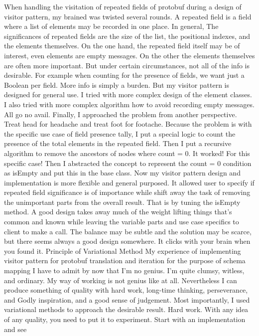 When handling the visitation of repeated fields of protobuf during a design of visitor pattern,
my brained was twisted several rounds.
A repeated field is a field where a list of elements may be recorded in one place. In general,
The significances of repeated fields are the size of the list, the positional indexes, and the
elements themselves. On the one hand, the repeated field itself may be of interest, even elements
are empty messages. On the other the elements themselves are often more important. But under
certain circumstances, not all of the info is desirable. For example when counting for the
presence of fields, we want just a Boolean per field. More info is simply a burden. But my
visitor pattern is designed for general use.
I tried with more complex design of the element classes. I also tried with more complex algorithm
how to avoid recording empty messages. All go no avail.
Finally, I approached the problem from another perspective. Treat head for headache and treat
foot for footache. Because the problem
is with the specific use case of field presence tally, I put a special logic to count the
presence of the total elements in the repeated field. Then I put a recursive algorithm to remove
the ancestors of nodes where count = 0. It worked! For this specific case!
Then I abstracted the concept to represent the count = 0 condition as isEmpty and put this in the
base class. Now my visitor pattern design and implementation is more flexible and general
purposed. It allowed user to specify if repeated field significance is of importance while shift
away the task of removing the unimportant parts from the overall result. That is by tuning the isEmpty method.
A good design takes away much of the weight lifting things that’s common and known while leaving
the variable parts and use case specifics to client to make a call. The balance may be subtle and
the solution may be scarce, but there seems always a good design somewhere. It clicks with your
brain when you found it.
Principle of Variational Method
My experience of implementing visitor pattern for protobuf translation and iteration for the
purpose of schema mapping
I have to admit by now that I’m no genius. I’m quite clumsy, witless, and ordinary. My way of
working is not genius like at all. Nevertheless I can produce something of quality with hard
work, long-time thinking, perseverance, and Godly inspiration, and a good sense of judgement.
Most importantly, I used variational methods to approach the desirable result. Hard work. With
any idea of any quality, you need to put it to experiment. Start with an implementation and see
